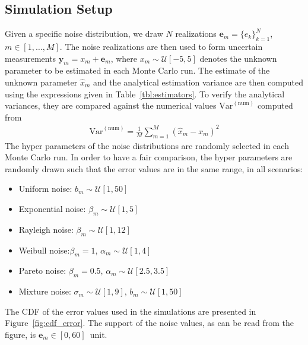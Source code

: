 \documentclass[journal]{IEEEtran}
\newcommand{\Var}{\mathrm{Var}}
\begin{document}
\subsection{Simulation Setup}
Given a specific noise distribution, we draw $N$ realizations $\bm{e}_m=\{e_k\}_{k=1}^N$, $m\in[1,\ldots,M]$. The noise realizations are then used to form uncertain measurements $\bm{y}_m = x_m + \bm{e}_m$, where $x_m\sim\mathcal{U}[-5,5]$ denotes the unknown parameter to be estimated in each Monte Carlo run. The estimate of the unknown parameter  $\hat{x}_m$ and the analytical estimation variance are then computed using the expressions given in Table~\ref{tbl:estimators}. To verify the analytical variances, they are compared against the numerical values $\Var^{(\mathrm{num})}$ computed from
%
%
\begin{align}
\Var^{(\mathrm{num})} = \frac{1}{M}\sum_{m=1}^{M} (\hat{x}_m - x_m)^2 
\end{align}
%
% 
The hyper parameters of the noise distributions are randomly selected in each Monte Carlo run. In order to have a fair comparison, the hyper parameters are randomly drawn such that the error values are in the same range, in all scenarios:
%
%
\begin{itemize}
	\item Uniform noise: $b_m\sim\mathcal{U}[1,50]$
	\item Exponential noise: $\beta_m\sim\mathcal{U}[1,5]$
	\item Rayleigh noise: $\beta_m\sim\mathcal{U}[1,12]$
	\item Weibull noise:$\beta_m=1$, $\alpha_m\sim\mathcal{U}[1,4]$
	\item Pareto noise: $\beta_m=0.5$, $\alpha_m\sim\mathcal{U}[2.5,3.5]$
	\item Mixture noise: $\sigma_m\sim\mathcal{U}[1,9]$, $b_m\sim\mathcal{U}[1,50]$
\end{itemize} 
%
%
The CDF of the error values used in the simulations are presented in Figure~\ref{fig:cdf_error}. The support of the noise values, as can be read from the figure, is $\bm{e}_m\in[0,60]$\, unit.
%
%
\end{document}
